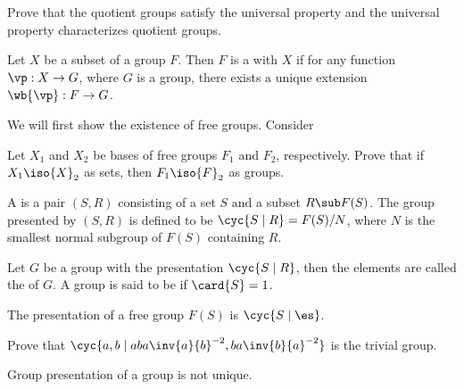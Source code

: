 \documentclass[10pt]{article}
\begin{document}
\begin{center}
\end{center}
\begin{problem}
    Prove that the quotient groups satisfy the universal property and the universal property characterizes quotient groups.
\end{problem}
\begin{Universal property for free groups}
    Let $X$ be a subset of a group $F$. Then $F$ is a  with  $X$ if for any function $\vp:X\to G$, where $G$ is a group, there exists a unique extension $\wb{\vp}:F\to G$.
\end{Universal property for free groups}
\begin{center}
\end{center}
\par
We will first show the existence of free groups. Consider 

\begin{problem}
    Let ${X}_{1}$ and ${X}_{2}$ be bases of free groups ${F}_{1}$ and ${F}_{2}$, respectively. Prove that if ${X}_{1}\iso{X}_{2}$ as sets, then ${F}_{1}\iso{F}_{2}$ as groups.
\end{problem}
\begin{definition}
    A  is a pair $(S,R)$ consisting of a set $S$ and a subset $R\sub F(S)$. The group presented by $(S,R)$ is defined to be $\cyc{S\mid R}=F(S)/N$, where $N$ is the smallest normal subgroup of $F(S)$ containing $R$.
\end{definition}
\begin{definition}
    Let $G$ be a group with the presentation $\cyc{S\mid R}$, then the elements are called the  of $G$. A group is said to be  if $\card{S}=1$.
\end{definition}
\begin{example}
    The presentation of a free group $F(S)$ is $\cyc{S\mid\es}$.
\end{example}
\begin{problem}
    Prove that $\cyc{a,b\mid aba\inv{a}{b}^{-2},ba\inv{b}{a}^{-2}}$ is the trivial group.
\end{problem}
\par
Group presentation of a group is not unique. 
\end{document}

